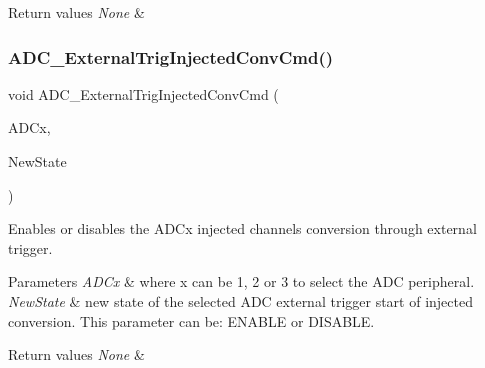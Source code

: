 \begin{DoxyRetVals}{Return values}
{\em None} & \\
\hline
\end{DoxyRetVals}
\mbox{\label{group___a_d_c___private___functions_gad81d134c083d8f407c819e6f4722d553}} 
\subsubsection{\texorpdfstring{ADC\_ExternalTrigInjectedConvCmd()}{ADC\_ExternalTrigInjectedConvCmd()}}
{\footnotesize\ttfamily void A\+D\+C\+\_\+\+External\+Trig\+Injected\+Conv\+Cmd (\begin{DoxyParamCaption}\item[{\mbox{\hyperlink{struct_a_d_c___type_def}{A\+D\+C\+\_\+\+Type\+Def}} $\ast$}]{A\+D\+Cx,  }\item[{\mbox{\hyperlink{group___exported__types_gac9a7e9a35d2513ec15c3b537aaa4fba1}{Functional\+State}}}]{New\+State }\end{DoxyParamCaption})}



Enables or disables the A\+D\+Cx injected channels conversion through external trigger. 


\begin{DoxyParams}{Parameters}
{\em A\+D\+Cx} & where x can be 1, 2 or 3 to select the A\+DC peripheral. \\
\hline
{\em New\+State} & new state of the selected A\+DC external trigger start of injected conversion. This parameter can be\+: E\+N\+A\+B\+LE or D\+I\+S\+A\+B\+LE. \\
\hline
\end{DoxyParams}

\begin{DoxyRetVals}{Return values}
{\em None} & \\
\hline
\end{DoxyRetVals}
\mbox{\label{group___a_d_c___private___functions_gafc02ce1e84e96b692adf085f61a0bca6}} 
